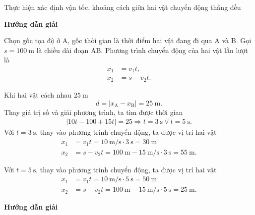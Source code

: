 \begin{dang}{Thực hiện xác định vận tốc, khoảng cách giữa hai vật chuyển động thẳng đều}
	{	\begin{center}
			\textbf{Hướng dẫn giải}
		\end{center}
		
		Chọn gốc tọa độ ở A, gốc thời gian là thời điểm hai vật đang đi qua A và B. Gọi $s=\SI{100}{\meter}$ là chiều dài đoạn AB. Phương trình chuyển động của hai vật lần lượt là 
			\begin{align*}
				x_1&=v_1t,\\
				x_2&=s-v_2t.
			\end{align*}
		
		Khi hai vật cách nhau $\SI{25}{\meter}$
		\begin{equation*}
			d=\left|x_\text{A}-x_\text{B}\right|=\SI{25}{\meter}.
		\end{equation*}
		Thay giá trị số và giải phương trình, ta tìm được thời gian 
		\begin{align*}
			\left|10t-100+15t\right|=25\Rightarrow t=\SI{3}{\second} \vee t=\SI{5}{\second}.
		\end{align*}
		Với $t=\SI{3}{\second}$, thay vào phương trình chuyển động, ta được vị trí hai vật
		\begin{align*}
			x_\text{1}&=v_1t=\SI{10}{\meter/\second}\cdot\SI{3}{\second}=\SI{30}{\meter}\\
			x_\text{2}&=s-v_2t=\SI{100}{\meter}-\SI{15}{\meter/\second}\cdot\SI{3}{\second}=\SI{55}{\meter}.
		\end{align*}
		
		Với $t=\SI{5}{\second}$, thay vào phương trình chuyển động, ta được vị trí hai vật 
		\begin{align*}
			x_\text{1}&=v_1t=\SI{10}{\meter/\second}\cdot\SI{5}{\second}=\SI{50}{\meter}\\
			x_\text{2}&=s-v_2t=\SI{100}{\meter}-\SI{15}{\meter/\second}\cdot\SI{5}{\second}=\SI{25}{\meter}.
		\end{align*}
	}
	{	\begin{center}
			\textbf{Hướng dẫn giải}
		\end{center}
		
}
\end{dang}
